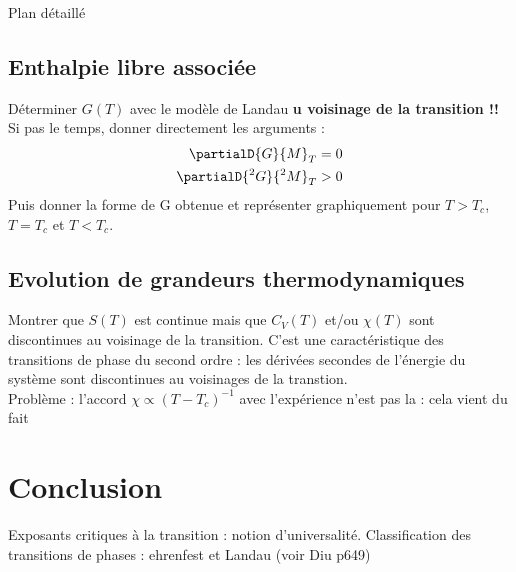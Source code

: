 \begin{reportBlock}{Plan détaillé}
  \subsection{Enthalpie libre associée}
  Déterminer $G(T)$ avec le modèle de Landau \textbf{u voisinage de la transition !!} Si pas le temps, donner directement les arguments :
  \begin{align}
      \partialD{G}{M}_T &= 0 \\
      \partialD{^2G}{^2M}_T &>0
  \end{align}
  Puis donner la forme de G obtenue et représenter graphiquement pour $T>T_c$, $T=T_c$ et $T<T_c$.
  \subsection{Evolution de grandeurs thermodynamiques}
  Montrer que $S(T)$ est continue mais que $C_V(T)$ et/ou $\chi(T)$ sont discontinues au voisinage de la transition. C'est une caractéristique des transitions de phase du second ordre : les dérivées secondes de l'énergie du système sont discontinues au voisinages de la transtion.\\

  Problème : l'accord $\chi\propto (T-T_c)^{-1}$ avec l'expérience n'est pas la : cela vient du fait 
  \section*{Conclusion}
  Exposants critiques à la transition : notion d'universalité. Classification des transitions de phases : ehrenfest et Landau (voir Diu p649)
\end{reportBlock}